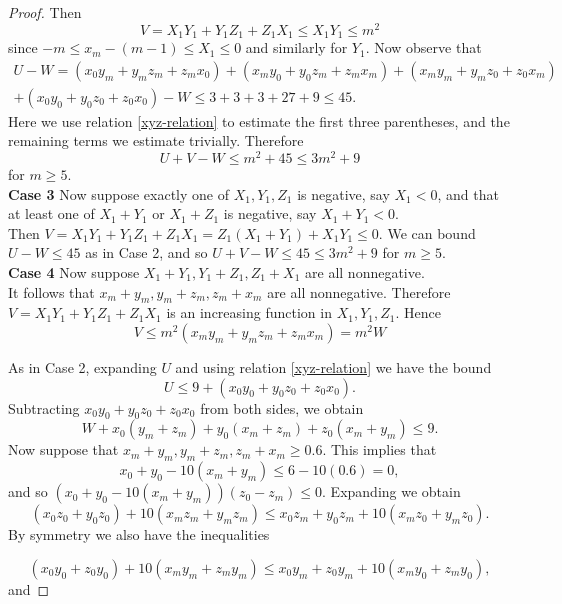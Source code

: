 \documentclass[a4paper,11pt,twoside]{amsart}
\theoremstyle{definition}
\numberwithin{equation}{section}
\begin{document}
\begin{proof}
Then $$V = X_1Y_1 + Y_1Z_1 + Z_1X_1 \leq X_1Y_1 \leq m^2$$ since $-m \leq x_m - (m-1) \leq X_1 \leq 0$ and similarly for $Y_1.$ Now observe that
\begin{multline*}
    U-W = (x_0y_m + y_mz_m + z_mx_0 ) + (x_my_0 + y_0z_m + z_mx_m) +  (x_my_m + y_mz_0 + z_0x_m) \\ 
    + (x_0y_0 + y_0z_0 + z_0x_0) - W  \leq 3 + 3 + 3 + 27 + 9 \leq 45.
\end{multline*}
Here we use relation \eqref{xyz-relation} to estimate the first three parentheses, and the remaining terms we estimate trivially.
Therefore $$U + V - W \leq m^2 + 45 \leq 3m^2 + 9$$ for $m \geq 5.$ \\
\textbf{Case 3} Now suppose exactly one of $X_1,Y_1,Z_1$ is negative, say $X_1 < 0$, and that at least one of $X_1 + Y_1$ or $X_1 + Z_1$ is negative, say $X_1 + Y_1 < 0$. \\ 
Then $V = X_1Y_1 + Y_1Z_1 + Z_1X_1 = Z_1(X_1 + Y_1) + X_1Y_1 \leq 0.$ We can bound $U - W \leq 45$ as in Case 2, and so $U + V - W \leq 45 \leq 3m^2 + 9$ for $m \geq 5.$ \\
\textbf{Case 4} Now suppose $X_1 + Y_1, Y_1 + Z_1, Z_1 + X_1$ are all nonnegative.\\ 
It follows that $x_m + y_m, y_m + z_m, z_m + x_m$ are all nonnegative. Therefore $V = X_1Y_1 + Y_1Z_1 + Z_1X_1$ is an increasing function in $X_1,Y_1,Z_1.$ Hence \begin{equation} \label{Vbound}
    V \leq m^2(x_my_m + y_mz_m + z_mx_m) = m^2W 
\end{equation}



As in Case 2, expanding $U$ and using relation \eqref{xyz-relation} we have the bound \begin{equation} \label{Ubound}
    U \leq 9 + (x_0y_0 + y_0z_0 + z_0x_0).
\end{equation}
Subtracting $x_0y_0 + y_0z_0 + z_0x_0$ from both sides, we obtain \begin{equation}
    W + x_0(y_m + z_m) + y_0(x_m + z_m) + z_0(x_m + y_m) \leq 9. \label{U - 00 ineq}
\end{equation}
Now suppose that $x_m + y_m, y_m + z_m, z_m + x_m \geq 0.6.$ This implies that $$x_0 + y_0 - 10(x_m+y_m) \leq 6 - 10(0.6) = 0,$$ and so $(x_0 + y_0 - 10(x_m + y_m))(z_0 - z_m) \leq 0.$ Expanding we obtain $$(x_0z_0 + y_0z_0)+10(x_mz_m + y_mz_m) \leq x_0z_m + y_0z_m + 10(x_mz_0 + y_mz_0).$$ By symmetry we also have the inequalities

$$(x_0y_0 + z_0y_0)+10(x_my_m + z_my_m) \leq x_0y_m + z_0y_m + 10(x_my_0 + z_my_0),$$ and


\end{proof}
\end{document}
